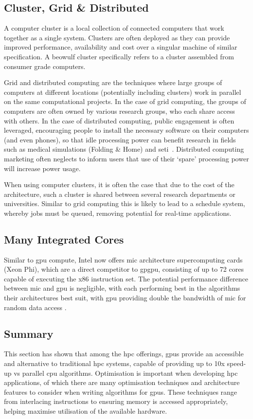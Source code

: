   \subsection{Cluster, Grid \& Distributed}
    A computer cluster is a local collection of connected computers that work together as a single system. Clusters are often deployed as they can provide improved performance, availability and cost over a singular machine of similar specification. A beowulf cluster specifically refers to a cluster assembled from consumer grade computers.

    Grid and distributed computing are the techniques where large groups of computers at different locations (potentially including clusters) work in parallel on the same computational projects. In the case of grid computing, the groups of computers are often owned by various research groups, who each share access with others. In the case of distributed computing, public engagement is often leveraged, encouraging people to install the necessary software on their computers (and even phones), so that idle processing power can benefit research in fields such as medical simulations (Folding \& Home) and \gls{seti}\ \cite{And04}. Distributed computing marketing often neglects to inform users that use of their `spare' processing power will increase power usage.

    When using computer clusters, it is often the case that due to the cost of the architecture, such a cluster is shared between several research departments or universities. Similar to grid computing this is likely to lead to a schedule system, whereby jobs must be queued, removing potential for real-time applications.

  \subsection{Many Integrated Cores}
    Similar to \gls{gpu} compute, Intel now offers \gls{mic} architecture supercomputing cards (Xeon Phi), which are a direct competitor to \gls{gpgpu}, consisting of up to 72 cores capable of executing the x86 instruction set. The potential performance difference between \gls{mic} and \gls{gpu} is negligible, with each performing best in the algorithms their architectures best suit, with \gls{gpu} providing double the bandwidth of \gls{mic} for random data access \cite{TK*13}.
    
  \subsection{Summary}
    This section has shown that among the \gls{hpc} offerings, \glspl{gpu} provide an accessible and alternative to traditional \gls{hpc} systems, capable of providing up to 10x speed-up vs parallel \gls{cpu} algorithms. Optimisation is important when developing \gls{hpc} applications, of which there are many optimisation techniques and architecture features to consider when writing algorithms for \glspl{gpu}. These techniques range from interlacing instructions to ensuring memory is accessed appropriately, helping maximise utilisation of the available hardware.
